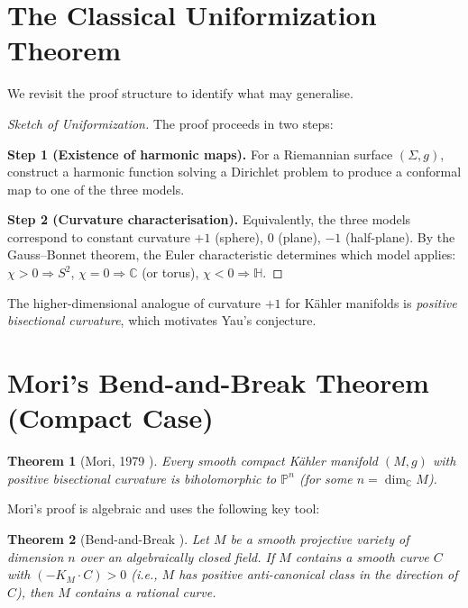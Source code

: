 \documentclass[12pt,a4paper]{amsart}
\newtheorem{theorem}{Theorem}[section]
\theoremstyle{definition}
\theoremstyle{remark}
\newcommand{\CC}{\mathbb{C}}
\newcommand{\PP}{\mathbb{P}}
\begin{document}
\section{The Classical Uniformization Theorem}

We revisit the proof structure to identify what may generalise.

\begin{proof}[Sketch of Uniformization]
The proof proceeds in two steps:

\medskip
\noindent\textbf{Step 1 (Existence of harmonic maps).}
For a Riemannian surface $(\Sigma, g)$, construct a harmonic function
solving a Dirichlet problem to produce a conformal map to one of the
three models.

\medskip
\noindent\textbf{Step 2 (Curvature characterisation).}
Equivalently, the three models correspond to constant curvature $+1$
(sphere), $0$ (plane), $-1$ (half-plane). By the Gauss--Bonnet theorem,
the Euler characteristic determines which model applies:
$\chi > 0 \Rightarrow S^2$, $\chi = 0 \Rightarrow \CC$ (or torus),
$\chi < 0 \Rightarrow \mathbb{H}$.
\end{proof}

The higher-dimensional analogue of curvature $+1$ for Kähler manifolds is
\emph{positive bisectional curvature}, which motivates Yau's conjecture.

\section{Mori's Bend-and-Break Theorem (Compact Case)}

\begin{theorem}[Mori, 1979 \cite{Mori1979}]
\label{thm:mori}
Every smooth compact Kähler manifold $(M, g)$ with positive bisectional
curvature is biholomorphic to $\PP^n$ (for some $n = \dim_\CC M$).
\end{theorem}

Mori's proof is algebraic and uses the following key tool:

\begin{theorem}[Bend-and-Break \cite{Mori1979}]
Let $M$ be a smooth projective variety of dimension $n$ over an algebraically
closed field.  If $M$ contains a smooth curve $C$ with
$(-K_M \cdot C) > 0$ (i.e., $M$ has positive anti-canonical class in the
direction of $C$), then $M$ contains a rational curve.
\end{theorem}
\end{document}
